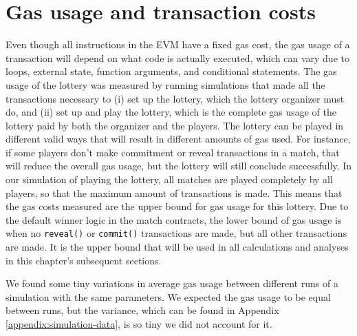 \section{Gas usage and transaction costs}
\label{sec:gas}

Even though all instructions in the EVM have a fixed gas cost, the gas usage of a transaction will depend on what code is actually executed, which can vary due to loops, external state, function arguments, and conditional statements. The gas usage of the lottery was measured by running simulations that made all the transactions necessary to (i) set up the lottery, which the lottery organizer must do, and (ii) set up and play the lottery, which is the complete gas usage of the lottery paid by both the organizer and the players. The lottery can be played in different valid ways that will result in different amounts of gas used. For instance, if some players don't make commitment or reveal transactions in a match, that will reduce the overall gas usage, but the lottery will still conclude successfully. In our simulation of playing the lottery, all matches are played completely by all players, so that the maximum amount of transactions is made. This means that the gas costs measured are the upper bound for gas usage for this lottery. Due to the default winner logic in the match contracts, the lower bound of gas usage is when no \texttt{reveal()} or \texttt{commit()} transactions are made, but all other transactions are made. It is the upper bound that will be used in all calculations and analyses in this chapter's subsequent sections.

We found some tiny variations in average gas usage between different runs of a simulation with the same parameters. We expected the gas usage to be equal between runs, but the variance, which can be found in Appendix \ref{appendix:simulation-data}, is so tiny we did not account for it.

